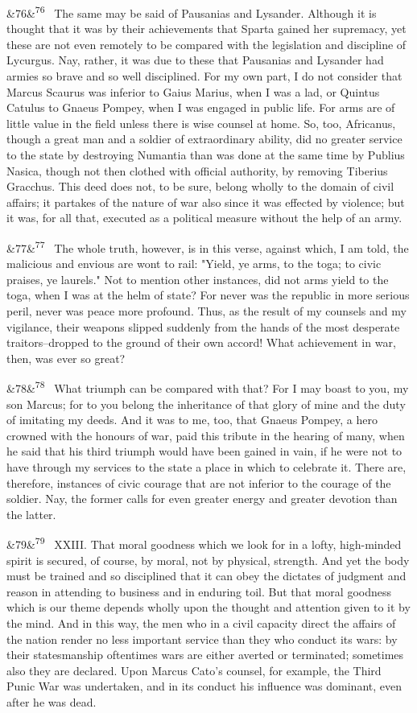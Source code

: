 \documentclass[12pt]{article}
\newcommand{\para}[1][]{\par\noindent\ifx&#1&\else\textsuperscript{\footnotesize #1}~\fi}
\begin{document}
\para[76] The same may be said of Pausanias and Lysander. Although it is thought that it was by their achievements that Sparta gained her supremacy, yet these are not even remotely to be compared with the legislation and discipline of Lycurgus. Nay, rather, it was due to these that Pausanias and Lysander had armies so brave and so well disciplined. For my own part, I do not consider that Marcus Scaurus was inferior to Gaius Marius, when I was a lad, or Quintus Catulus to Gnaeus Pompey, when I was engaged in public life. For arms are of little value in the field unless there is wise counsel at home. So, too, Africanus, though a great man and a soldier of extraordinary ability, did no greater service to the state by destroying Numantia than was done at the same time by Publius Nasica, though not then clothed with official authority, by removing Tiberius Gracchus. This deed does not, to be sure, belong wholly to the domain of civil affairs; it partakes of the nature of war also since it was effected by violence; but it was, for all that, executed as a political measure without the help of an army.

\para[77] The whole truth, however, is in this verse, against which, I am told, the malicious and envious are wont to rail: "Yield, ye arms, to the toga; to civic praises, ye laurels." Not to mention other instances, did not arms yield to the toga, when I was at the helm of state? For never was the republic in more serious peril, never was peace more profound. Thus, as the result of my counsels and my vigilance, their weapons slipped suddenly from the hands of the most desperate traitors--dropped to the ground of their own accord! What achievement in war, then, was ever so great?

\para[78] What triumph can be compared with that? For I may boast to you, my son Marcus; for to you belong the inheritance of that glory of mine and the duty of imitating my deeds. And it was to me, too, that Gnaeus Pompey, a hero crowned with the honours of war, paid this tribute in the hearing of many, when he said that his third triumph would have been gained in vain, if he were not to have through my services to the state a place in which to celebrate it. There are, therefore, instances of civic courage that are not inferior to the courage of the soldier. Nay, the former calls for even greater energy and greater devotion than the latter.

\para[79] XXIII. That moral goodness which we look for in a lofty, high-minded spirit is secured, of course, by moral, not by physical, strength. And yet the body must be trained and so disciplined that it can obey the dictates of judgment and reason in attending to business and in enduring toil. But that moral goodness which is our theme depends wholly upon the thought and attention given to it by the mind. And in this way, the men who in a civil capacity direct the affairs of the nation render no less important service than they who conduct its wars: by their statesmanship oftentimes wars are either averted or terminated; sometimes also they are declared. Upon Marcus Cato's counsel, for example, the Third Punic War was undertaken, and in its conduct his influence was dominant, even after he was dead.
\end{document}
